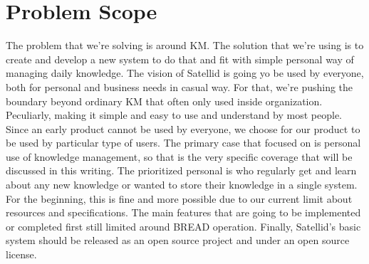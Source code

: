 \section{Problem Scope}
\label{sec:problem-scope}

The problem that we're solving is around \ac{KM}.
The solution that we're using is to create and develop a new system to do that and fit with simple personal way of managing daily knowledge.
The vision of Satellid is going yo be used by everyone, both for personal and business needs in casual way.
For that, we're pushing the boundary beyond ordinary \ac{KM} that often only used inside organization.
Peculiarly, making it simple and easy to use and understand by most people.
Since an early product cannot be used by everyone, we choose for our product to be used by particular type of users.
The primary case that focused on is personal use of knowledge management, so that is the very specific coverage that will be discussed in this writing.
The prioritized personal is who regularly get and learn about any new knowledge or wanted to store their knowledge in a single system.
For the beginning, this is fine and more possible due to our current limit about resources and specifications.
The main features that are going to be implemented or completed first still limited around \ac{BREAD} operation.
Finally, Satellid's basic system should be released as an open source project and under an open source license.
